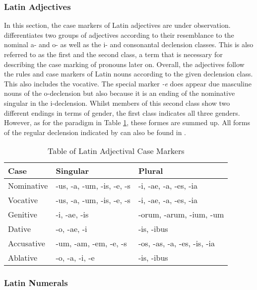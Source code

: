 \documentclass[11pt,a4paper,twoside,openright]{scrbook}
\begin{document}
\subsubsection{Latin Adjectives}

In this section, the case markers of Latin adjectives are under observation.
\citet{touratier2013lat} differentiates two groups of adjectives according to their resemblance to the nominal a- and o- as well as the i- and consonantal declension classes. This is also referred to as the first and the second class, a term that is necessary for describing the case marking of pronouns later on. Overall, the adjectives follow the rules and case markers of Latin nouns according to the given declension class. This also includes the vocative. The special marker \textit{-e} does appear due masculine nouns of the o-declension but also because it is an ending of the nominative singular in the i-declension. Whilst members of this second class show two different endings in terms of gender, the first class indicates all three genders. However, as for the paradigm in Table \ref{table:latin_adjectives}, these formes are summed up. All forms of the regular declension indicated by \citet{touratier2013lat} can also be found in \citet{rubenbauer1995lat}.

\begin{table}[!htbp]
\centering

\begin{tabular}{|p{}||p{5cm}|p{5cm}|}
 \hline
 Case & Singular & Plural \\ [1ex]
 \hline\hline
 Nominative & -us, -a, -um, -is, -e, -s & -i, -ae, -a, -es, -ia \\ [1ex] 
 \hline
 Vocative & -us, -a, -um, -is, -e, -s & -i, -ae, -a, -es, -ia \\ [1ex] 
 \hline
 Genitive & -i, -ae, -is & -orum, -arum, -ium, -um \\ [1ex]
 \hline 
 Dative & -o, -ae, -i & -is, -ibus  \\ [1ex]
 \hline
 Accusative & -um, -am, -em, -e, -s & -os, -as, -a, -es, -is, -ia  \\ [1ex] 
 \hline
 Ablative & -o, -a, -i, -e & -is, -ibus \\ [1ex]
 \hline
\end{tabular}
\caption{Table of Latin Adjectival Case Markers}
\label{table:latin_adjectives}
\end{table}




\subsubsection{Latin Numerals}
\end{document}
